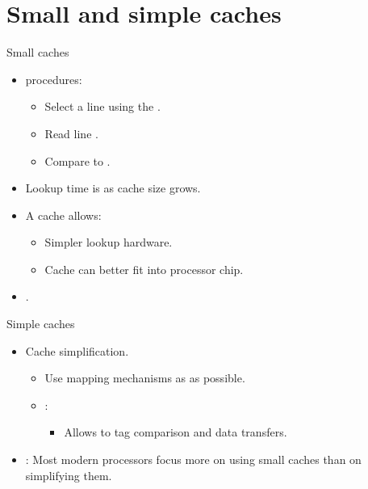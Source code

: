 \section{Small and simple caches}

\begin{frame}[t]{Small caches}
\begin{itemize}
  \item {} procedures:
    \begin{itemize}
      \item Select a line using the .
      \item Read line .
      \item Compare to .
    \end{itemize}

  \item Lookup time is  as cache size grows.
  
  \item A  cache allows:
    \begin{itemize}
      \item Simpler lookup hardware.
      \item Cache can better fit into processor chip.
    \end{itemize}

  \item {}.
\end{itemize}
\end{frame}

\begin{frame}[t]{Simple caches}
\begin{itemize}
  \item Cache simplification.
    \begin{itemize}
      \item Use mapping mechanisms as  as possible.
      \item {}:
        \begin{itemize}
          \item Allows to  tag comparison
                and data transfers.
        \end{itemize}
    \end{itemize}

  \item {}:
        Most modern processors focus more on using small caches
        than on simplifying them.
\end{itemize}
\end{frame}

